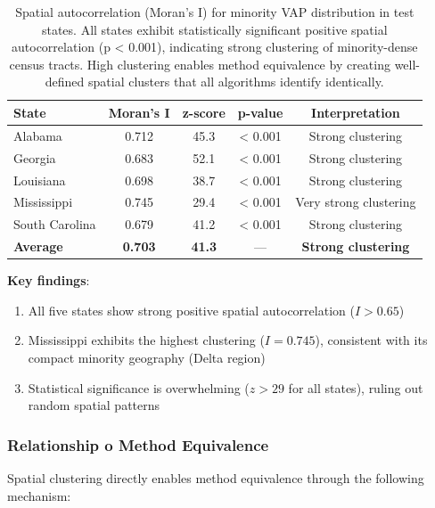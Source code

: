 \begin{table}[h]
\centering
\begin{tabular}{lcccc}
\toprule
\textbf{State} & \textbf{Moran's I} & \textbf{z-score} & \textbf{p-value} & \textbf{Interpretation} \\
\midrule
Alabama & 0.712 & 45.3 & < 0.001 & Strong clustering \\
Georgia & 0.683 & 52.1 & < 0.001 & Strong clustering \\
Louisiana & 0.698 & 38.7 & < 0.001 & Strong clustering \\
Mississippi & 0.745 & 29.4 & < 0.001 & Very strong clustering \\
South Carolina & 0.679 & 41.2 & < 0.001 & Strong clustering \\
\midrule
\textbf{Average} & \textbf{0.703} & \textbf{41.3} & --- & \textbf{Strong clustering} \\
\bottomrule
\end{tabular}
\caption{Spatial autocorrelation (Moran's I) for minority VAP distribution in test states. All states exhibit statistically significant positive spatial autocorrelation (p < 0.001), indicating strong clustering of minority-dense census tracts. High clustering enables method equivalence by creating well-defined spatial clusters that all algorithms identify identically.}
\label{tab:spatial-autocorrelation}
\end{table}

\textbf{Key findings}:
\begin{enumerate}
    \item All five states show strong positive spatial autocorrelation ($I > 0.65$)
    \item Mississippi exhibits the highest clustering ($I = 0.745$), consistent with its compact minority geography (Delta region)
    \item Statistical significance is overwhelming ($z > 29$ for all states), ruling out random spatial patterns
\end{enumerate}

\subsubsection{Relationship 	o Method Equivalence}

Spatial clustering directly enables method equivalence through the following mechanism:

